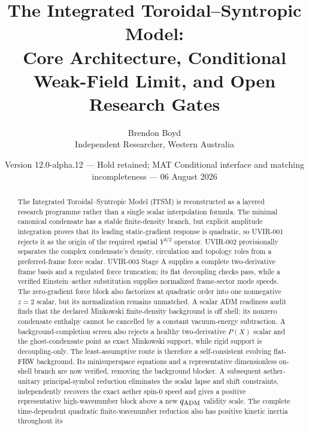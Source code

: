 ﻿\documentclass[11pt]{article}
\title{The Integrated Toroidal--Syntropic Model:\\
Core Architecture, Conditional Weak-Field Limit, and Open Research Gates}
\author{Brendon Boyd\\Independent Researcher, Western Australia}
\date{Version 12.0-alpha.12 --- Hold retained; MAT Conditional interface and matching incompleteness --- 06 August 2026}
\begin{document}
\maketitle

\begin{center}
\end{center}

\begin{abstract}
The Integrated Toroidal--Syntropic Model (ITSM) is reconstructed as a layered
research programme rather than a single scalar interpolation formula.  The
minimal canonical condensate has a stable finite-density branch, but explicit
amplitude integration proves that its leading static-gradient response is
quadratic, so UVIR-001 rejects it as the origin of the required spatial
$Y^{3/2}$ operator.  UVIR-002 provisionally separates the complex condensate's
density, circulation and topology roles from a preferred-frame force scalar.
UVIR-003 Stage A supplies a complete two-derivative frame basis and a regulated
force truncation; its flat decoupling checks pass, while a verified
Einstein--aether substitution supplies normalized frame-sector mode speeds.
The zero-gradient force block also factorizes at quadratic order into one
nonnegative $z=2$ scalar, but its normalization remains unmatched.  A scalar
ADM readiness audit finds that the declared Minkowski finite-density
background is off shell: its nonzero condensate enthalpy cannot be cancelled
by a constant vacuum-energy subtraction.  A background-completion screen also
rejects a healthy two-derivative $P(X)$ scalar and the ghost-condensate point
as exact Minkowski support, while rigid support is decoupling-only.  The
least-assumptive route is therefore a self-consistent evolving flat-FRW
background.  Its minisuperspace equations and a representative dimensionless
on-shell branch are now verified, removing the background blocker.  A
subsequent aether-unitary principal-symbol reduction eliminates the scalar
lapse and shift constraints, independently recovers the exact aether spin-0
speed and gives a positive representative high-wavenumber block above a new
$q_{\rm ADM}$ validity scale.  The complete time-dependent quadratic
finite-wavenumber reduction also has positive kinetic inertia throughout its

\end{abstract}
\end{document}
